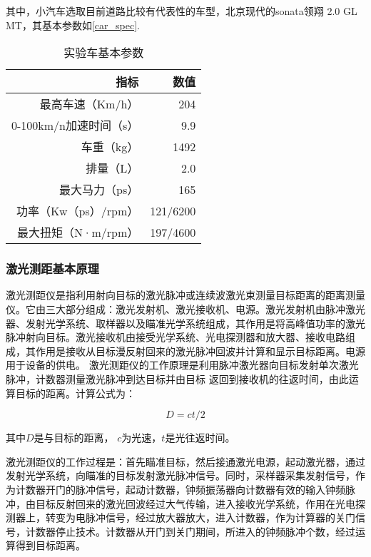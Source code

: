 其中，小汽车选取目前道路比较有代表性的车型，北京现代的sonata领翔 2.0 GL MT，其基本参数如\autoref{car_spec}.


\begin{table}[htbp]
  \centering
  \caption{实验车基本参数}
    \begin{tabular}{rr}
    \addlinespace
    \toprule
	指标&	数值\\
	\midrule
    最高车速（Km/h） & 204 \\
    0-100km/n加速时间（s） & 9.9 \\
    车重（kg）    & 1492 \\
    排量（L） & 2.0  \\
    最大马力（ps） & 165 \\
    功率（Kw（ps）/rpm） & 121/6200 \\
    最大扭矩（N·m/rpm） & 197/4600 \\
    \bottomrule
    \end{tabular}%
  \label{car_spec}%
\end{table}%


\subsubsection{激光测距基本原理}
激光测距仪是指利用射向目标的激光脉冲或连续波激光束测量目标距离的距离测量仪。它由三大部分组成：激光发射机、激光接收机、电源。激光发射机由脉冲激光器、发射光学系统、取样器以及瞄准光学系统组成，其作用是将高峰值功率的激光脉冲射向目标。激光接收机由接受光学系统、光电探测器和放大器、接收电路组成，其作用是接收从目标漫反射回来的激光脉冲回波并计算和显示目标距离。电源用于设备的供电。
激光测距仪的工作原理是利用脉冲激光器向目标发射单次激光脉冲，计数器测量激光脉冲到达目标并由目标 返回到接收机的往返时间，由此运算目标的距离。计算公式为：

\begin{equation}
D = ct/2
\end{equation}

其中$D$是与目标的距离， $c$为光速，$t$是光往返时间。

激光测距仪的工作过程是：首先瞄准目标，然后接通激光电源，起动激光器，通过发射光学系统，向瞄准的目标发射激光脉冲信号。同时，采样器采集发射信号，作为计数器开门的脉冲信号，起动计数器，钟频振荡器向计数器有效的输入钟频脉冲，由目标反射回来的激光回波经过大气传输，进入接收光学系统，作用在光电探测器上，转变为电脉冲信号，经过放大器放大，进入计数器，作为计算器的关门信号，计数器停止技术。计数器从开门到关门期间，所进入的钟频脉冲个数，经过运算得到目标距离。


